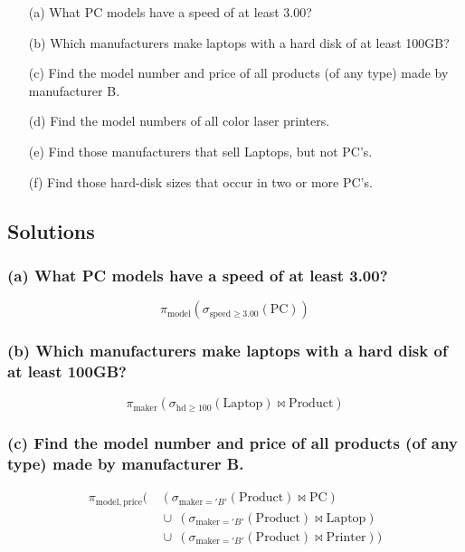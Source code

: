 \documentclass{cshwk}
\begin{document}
\begin{enumerate}
    \item[(a)] What PC models have a speed of at least 3.00?
    \item[(b)] Which manufacturers make laptops with a hard disk of at least 100GB?
    \item[(c)] Find the model number and price of all products (of any type) made by
          manufacturer B.
    \item[(d)] Find the model numbers of all color laser printers.
    \item[(e)] Find those manufacturers that sell Laptops, but not PC's.
    \item[(f)] Find those hard-disk sizes that occur in two or more PC's.
\end{enumerate}


\subsection*{Solutions}

\subsubsection*{(a) What PC models have a speed of at least 3.00?}

\[
    \pi_{\text{model}}(\sigma_{\text{speed} \geq 3.00}(\text{PC}))
\]

\subsubsection*{(b) Which manufacturers make laptops with a hard disk of at least 100GB?}

\[
    \pi_{\text{maker}} ( \sigma_{\text{hd} \geq 100} (\text{Laptop}) \bowtie
    \text{Product} )
\]


\subsubsection*{(c) Find the model number and price of all products (of any type) made by manufacturer B.}

\begin{align*}
    \pi_{\text{model},\ \text{price}} \bigg( & \
    ( \sigma_{\text{maker} = 'B'} (\text{Product}) \bowtie \text{PC} )     \\
                                             & \ \cup\
    ( \sigma_{\text{maker} = 'B'} (\text{Product}) \bowtie \text{Laptop} ) \\
                                             & \ \cup\
    ( \sigma_{\text{maker} = 'B'} (\text{Product}) \bowtie \text{Printer} )
    \bigg)
\end{align*}
\end{document}
